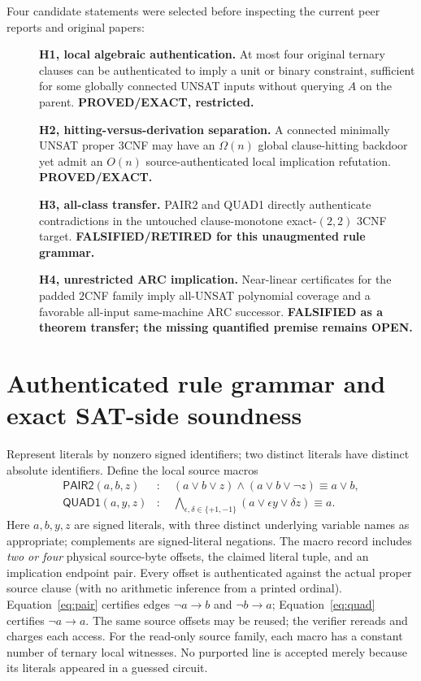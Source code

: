 \documentclass[11pt]{article}
\begin{document}
Four candidate statements were selected before inspecting the current peer reports and original papers:
\begin{description}
\item[] \textbf{H1, local algebraic authentication.} At most four original ternary clauses can be authenticated to imply a unit or binary constraint, sufficient for some globally connected UNSAT inputs without querying $A$ on the parent. \textbf{PROVED/EXACT, restricted.}
\item[] \textbf{H2, hitting-versus-derivation separation.} A connected minimally UNSAT proper 3CNF may have an $\Omega(n)$ global clause-hitting backdoor yet admit an $O(n)$ source-authenticated local implication refutation. \textbf{PROVED/EXACT.}
\item[] \textbf{H3, all-class transfer.} PAIR2 and QUAD1 directly authenticate contradictions in the untouched clause-monotone exact-$(2,2)$ 3CNF target. \textbf{FALSIFIED/RETIRED for this unaugmented rule grammar.}
\item[] \textbf{H4, unrestricted ARC implication.} Near-linear certificates for the padded $2$CNF family imply all-UNSAT polynomial coverage and a favorable all-input same-machine ARC successor. \textbf{FALSIFIED as a theorem transfer; the missing quantified premise remains OPEN.}
\end{description}

\section{Authenticated rule grammar and exact SAT-side soundness}
Represent literals by nonzero signed identifiers; two distinct literals have distinct absolute identifiers. Define the local source macros
\begin{align}
 \mathsf{PAIR2}(a,b,z)&:\quad (a\vee b\vee z)\wedge(a\vee b\vee\neg z) \equiv a\vee b, \label{eq:pair}\\
 \mathsf{QUAD1}(a,y,z)&:\quad\bigwedge_{\epsilon,\delta\in\{+1,-1\}}(a\vee\epsilon y\vee\delta z)\equiv a.\label{eq:quad}
\end{align}
Here $a,b,y,z$ are signed literals, with three distinct underlying variable names as appropriate; complements are signed-literal negations. The macro record includes \emph{two or four} physical source-byte offsets, the claimed literal tuple, and an implication endpoint pair. Every offset is authenticated against the actual proper source clause (with no arithmetic inference from a printed ordinal). Equation~\eqref{eq:pair} certifies edges $\neg a\to b$ and $\neg b\to a$; Equation~\eqref{eq:quad} certifies $\neg a\to a$. The same source offsets may be reused; the verifier rereads and charges each access. For the read-only source family, each macro has a constant number of ternary local witnesses. No purported line is accepted merely because its literals appeared in a guessed circuit.
\end{document}
